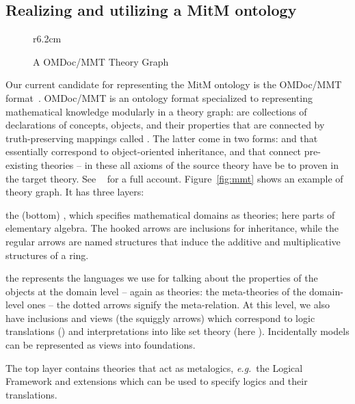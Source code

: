 \subsection{Realizing and utilizing a MitM ontology}

\begin{wrapfigure}r{6.2cm}\centering\vspace*{-2em}
  \vspace*{-.5em}
  \caption{A OMDoc/MMT Theory Graph}\label{fig:mmt}\vspace*{-1em}
  \label{figure.omdoc.example}
\end{wrapfigure}
Our current candidate for representing the MitM ontology is the OMDoc/MMT
format~\cite{Kohlhase:OMDoc1.2,MMTSVN:on}. OMDoc/MMT is an ontology format specialized to
representing mathematical knowledge modularly in a theory graph:  are
collections of declarations of concepts, objects, and their properties that are connected
by truth-preserving mappings called . The latter come in two
forms:  and  that essentially correspond to
object-oriented inheritance, and  that connect pre-existing theories -- in
these all axioms of the source theory have be to proven in the target theory. See
~\cite{RabKoh:WSMSML13} for a full account. Figure~\ref{fig:mmt} shows an example of
theory graph. It has three layers:
\begin{compactenum}[\em i\rm)]
\item the (bottom) , which specifies mathematical domains as theories; here
  parts of elementary algebra. The hooked arrows are inclusions for inheritance, while the
  regular arrows are named structures that induce the additive and multiplicative
  structures of a ring.
\item the  represents the languages we use for talking about the
  properties of the objects at the domain level -- again as theories: the meta-theories of
  the domain-level ones -- the dotted arrows signify the meta-relation. At this level, we
  also have inclusions and views (the squiggly arrows) which correspond to logic
  translations () and interpretations into  like
  set theory (here ). Incidentally models can be represented as views into
  foundations.
\item The top layer contains theories that act as metalogics, \emph{e.g.}\ the Logical Framework
   and extensions which can be used to specify logics and their translations.
\end{compactenum}
